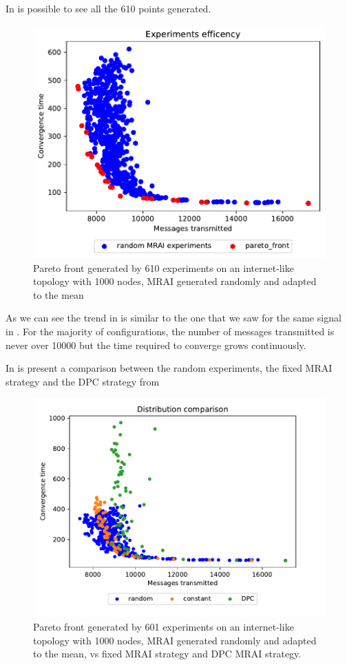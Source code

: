 In  is possible to see all the \num{610} points
generated.

\begin{figure}[h]
    \centering
    \includegraphics[width=.5\textwidth]{images/internet_like/1000/random.pdf}
	\caption{Pareto front generated by \num{610} experiments on an internet-like
	topology with \num{1000} nodes, \ac{MRAI} generated randomly and adapted to
	the mean }
    \label{fig:random_pareto_front}
\end{figure}

As we can see the trend in  is similar to the one
that we saw for the same signal in .
For the majority of configurations, the number of messages transmitted is never
over \num{10000} but the time required to converge grows continuously.

In  is present a comparison between the random
experiments, the fixed \ac{MRAI} strategy and the \ac{DPC} strategy from

\begin{figure}[h]
    \centering
    \includegraphics[width=.57\textwidth]{images/internet_like/1000/random_vs_all.pdf}
	\caption{Pareto front generated by \num{601} experiments on an internet-like
	topology with \num{1000} nodes, \ac{MRAI} generated randomly and adapted to
	the mean, vs fixed \ac{MRAI} strategy and \ac{DPC} \ac{MRAI} strategy.
	}
    \label{fig:pareto_comparison}
\end{figure}

